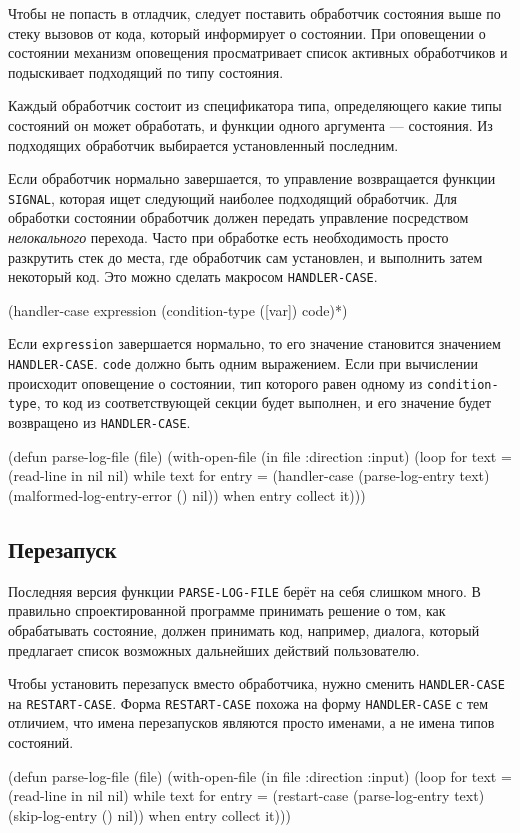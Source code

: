 Чтобы не попасть в отладчик, следует поставить обработчик состояния выше по стеку вызовов от кода, который информирует о состоянии. При оповещении о состоянии механизм оповещения просматривает список активных обработчиков и подыскивает подходящий по типу состояния.

Каждый обработчик состоит из спецификатора типа, определяющего какие типы состояний он может обработать, и функции одного аргумента — состояния. Из подходящих обработчик выбирается установленный последним.

Если обработчик нормально завершается, то управление возвращается функции \lstinline{SIGNAL}, которая ищет следующий наиболее подходящий обработчик. Для обработки состоянии обработчик должен передать управление посредством \emph{нелокального} перехода. Часто при обработке есть необходимость просто разкрутить стек до места, где обработчик сам установлен, и выполнить затем некоторый код. Это можно сделать макросом \lstinline{HANDLER-CASE}.
\begin{cllst}{}{}
(handler-case expression
  (condition-type ([var]) code)*)
\end{cllst}

Если \lstinline{expression} завершается нормально, то его значение становится значением \lstinline{HANDLER-CASE}. \lstinline{code} должно быть одним выражением. Если при вычислении происходит оповещение о состоянии, тип которого равен одному из \lstinline{condition-type}, то код из соответствующей секции будет выполнен, и его значение будет возвращено из \lstinline{HANDLER-CASE}.
\begin{cllst}{}{}
(defun parse-log-file (file)
  (with-open-file (in file :direction :input)
    (loop for text = (read-line in nil nil) while text
       for entry = (handler-case (parse-log-entry text)
                     (malformed-log-entry-error () nil))
       when entry collect it)))
\end{cllst}

\subsection{Перезапуск}
Последняя версия функции \lstinline{PARSE-LOG-FILE} берёт на себя слишком много. В правильно спроектированной программе принимать решение о том, как обрабатывать состояние, должен принимать код, например, диалога, который предлагает список возможных дальнейших действий пользователю.

Чтобы установить перезапуск вместо обработчика, нужно сменить \lstinline{HANDLER-CASE} на \lstinline{RESTART-CASE}. Форма \lstinline{RESTART-CASE} похожа на форму \lstinline{HANDLER-CASE} с тем отличием, что имена перезапусков являются просто именами, а не имена типов состояний.
\begin{cllst}{}{}
(defun parse-log-file (file)
  (with-open-file (in file :direction :input)
    (loop for text = (read-line in nil nil) while text
       for entry = (restart-case (parse-log-entry text)
                     (skip-log-entry () nil))
       when entry collect it)))
\end{cllst}

